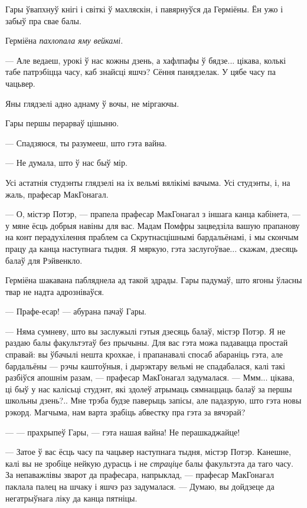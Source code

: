 Гары ўвапхнуў кнігі і світкі ў махляскін, і павярнуўся да Герміёны. Ён ужо 
і забыў пра свае балы.

Герміёна \emph{пахлопала яму вейкамі}.

--- Але ведаеш, урокі ў нас кожны дзень, а хафлпафы ў бядзе... цікава, колькі 
табе патрэбіцца часу, каб знайсці яшчэ? Сёння панядзелак. У цябе часу па чацьвер.

Яны глядзелі адно аднаму ў вочы, не міргаючы.

Гары першы перарваў цішыню.

--- Спадзяюся, ты разумееш, што гэта вайна.

--- Не думала, што ў нас быў мір.

Усі астатнія студэнты глядзелі на іх вельмі вялікімі вачыма. Усі студэнты, і, на жаль,
прафесар МакГонагал.

--- О, містэр Потэр, --- прапела прафесар МакГонагал з іншага канца кабінета, --- у 
мяне ёсць добрыя навіны для вас. Мадам Помфры зацведзіла вашую прапанову на конт
перадухілення праблем са Скрутнасцішнымі бардальёнамі, і мы скончым працу 
да канца наступнага тыдня. Я мяркую, гэта заслугоўвае... скажам, дзесяць балаў для 
Рэйвенкло.

Герміёна шакавана пабляднела ад такой здрады. Гары падумаў, што ягоны ўласны 
твар не надта адрозніваўся.

--- Прафе-есар! --- абурана пачаў Гары.

--- Няма сумневу, што вы заслужылі гэтыя дзесяць балаў, містэр Потэр.
Я не раздаю балы факультэтаў без прычыны. Для вас гэта можа падавацца 
простай справай: вы ўбачылі нешта крохкае, і прапанавалі спосаб абараніць гэта, 
але бардальёны --- рэчы каштоўныя, і дырэктару вельмі не спадабалася, калі 
такі разбіўся апошнім разам, --- прафесар МакГонагал задумалася. --- Ммм... цікава, 
ці быў у нас калісьці студэнт, які здолеў атрымаць сямнаццаць балаў за 
першы школьны дзень?.. Мне трэба будзе паверыць запісы, але падазрую, што 
гэта новы рэкорд. Магчыма, нам варта зрабіць абвестку пра гэта за вячэрай? 

---  --- прахрыпеў Гары, --- гэта нашая вайна! Не перашкаджайце!

--- Затое ў вас ёсць часу па чацьвер наступнага тыдня, містэр Потэр. Канешне, калі 
вы не зробіце нейкую дурасць і не \emph{страціце} балы факультэта да таго часу. 
За непаважлівы зварот да прафесара, напрыклад, --- прафесар МакГонагал паклала палец
на шчаку і яшчэ раз задумалася. --- Думаю, вы дойдзеце да негатрыўнага 
ліку да канца пятніцы.

